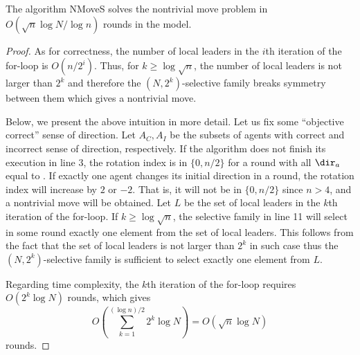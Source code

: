 \begin{lemma}
The algorithm NMoveS solves the nontrivial move problem in $O(\sqrt{n}\log N/\log n)$ rounds
in the {\perceptive} model.
\end{lemma}
\iffull
\begin{proof}
As for correctness, the number of local leaders in the $i$th iteration of the
for-loop is $O(n/2^i)$. Thus, for $k\geq \log\sqrt{n}$, the number of local leaders
is not larger than $2^k$ and therefore the $(N,2^k)$-selective family breaks symmetry
between them which gives a nontrivial move. 



Below, we present the above intuition in more detail.
Let us fix some ``objective correct'' sense of direction.
Let $A_C,A_I$ be the subsets of agents with correct and 
incorrect sense of direction, respectively.
If the algorithm does not finish its execution in line 3,
the rotation index is in $\{0,n/2\}$ for a round with all $\dir_a$ equal to
{\lleft}. If exactly one agent changes its initial direction in
a round, the rotation index will increase by $2$ or $-2$.
That is, it will not be in $\{0,n/2\}$ since $n>4$,
and a nontrivial move will be obtained.
Let $L$ be the set of local leaders in the $k$th iteration of the for-loop.
If $k\geq \log \sqrt{n}$, the selective family in line 11 will select in some
round exactly one element from the set of local leaders. This follows
from the fact that the set of local leaders is not larger than $2^k$
in such case thus the $(N,2^k)$-selective family is sufficient to select
exactly one element from $L$.

Regarding time complexity, the $k$th iteration of the for-loop requires
$O(2^k\log N)$ rounds, which gives
$$O\left(\sum_{k=1}^{(\log n)/2} 2^k\log N\right)=O(\sqrt{n}\log N)$$
rounds. 
\end{proof}
\else
\fi


